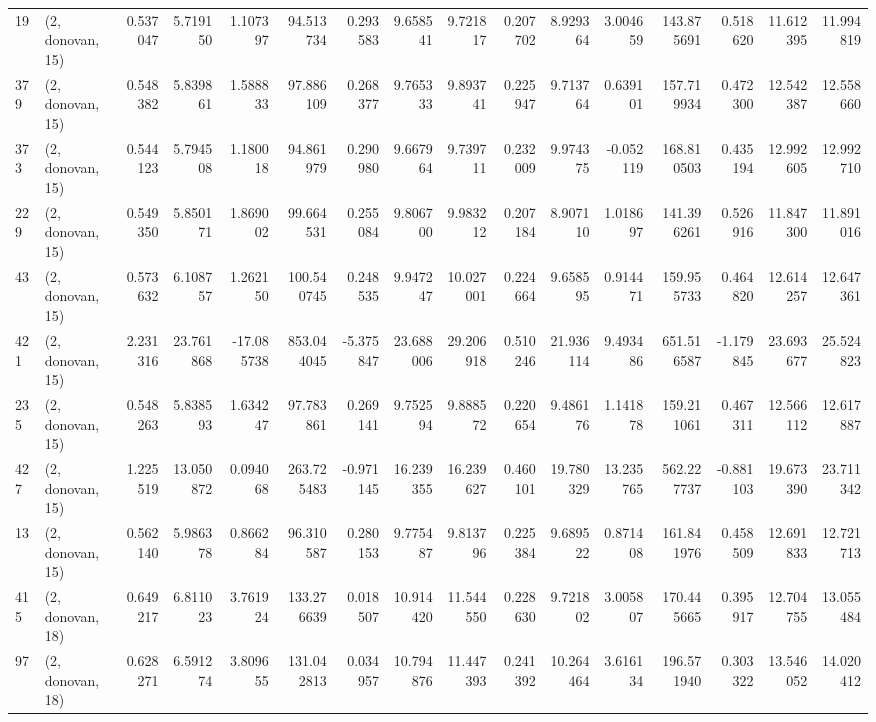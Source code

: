\begin{tabular}{llrrrrrrrrrrrrrr}
19  &  (2, donovan, 15) &   0.537047 &   5.719150 &   1.107397 &    94.513734 &   0.293583 &   9.658541 &   9.721817 &  0.207702 &   8.929364 &   3.004659 &   143.875691 &  0.518620 &  11.612395 &  11.994819 \\
379 &  (2, donovan, 15) &   0.548382 &   5.839861 &   1.588833 &    97.886109 &   0.268377 &   9.765333 &   9.893741 &  0.225947 &   9.713764 &   0.639101 &   157.719934 &  0.472300 &  12.542387 &  12.558660 \\
373 &  (2, donovan, 15) &   0.544123 &   5.794508 &   1.180018 &    94.861979 &   0.290980 &   9.667964 &   9.739711 &  0.232009 &   9.974375 &  -0.052119 &   168.810503 &  0.435194 &  12.992605 &  12.992710 \\
229 &  (2, donovan, 15) &   0.549350 &   5.850171 &   1.869002 &    99.664531 &   0.255084 &   9.806700 &   9.983212 &  0.207184 &   8.907110 &   1.018697 &   141.396261 &  0.526916 &  11.847300 &  11.891016 \\
43  &  (2, donovan, 15) &   0.573632 &   6.108757 &   1.262150 &   100.540745 &   0.248535 &   9.947247 &  10.027001 &  0.224664 &   9.658595 &   0.914471 &   159.955733 &  0.464820 &  12.614257 &  12.647361 \\
421 &  (2, donovan, 15) &   2.231316 &  23.761868 & -17.085738 &   853.044045 &  -5.375847 &  23.688006 &  29.206918 &  0.510246 &  21.936114 &   9.493486 &   651.516587 & -1.179845 &  23.693677 &  25.524823 \\
235 &  (2, donovan, 15) &   0.548263 &   5.838593 &   1.634247 &    97.783861 &   0.269141 &   9.752594 &   9.888572 &  0.220654 &   9.486176 &   1.141878 &   159.211061 &  0.467311 &  12.566112 &  12.617887 \\
427 &  (2, donovan, 15) &   1.225519 &  13.050872 &   0.094068 &   263.725483 &  -0.971145 &  16.239355 &  16.239627 &  0.460101 &  19.780329 &  13.235765 &   562.227737 & -0.881103 &  19.673390 &  23.711342 \\
13  &  (2, donovan, 15) &   0.562140 &   5.986378 &   0.866284 &    96.310587 &   0.280153 &   9.775487 &   9.813796 &  0.225384 &   9.689522 &   0.871408 &   161.841976 &  0.458509 &  12.691833 &  12.721713 \\
415 &  (2, donovan, 18) &   0.649217 &   6.811023 &   3.761924 &   133.276639 &   0.018507 &  10.914420 &  11.544550 &  0.228630 &   9.721802 &   3.005807 &   170.445665 &  0.395917 &  12.704755 &  13.055484 \\
97  &  (2, donovan, 18) &   0.628271 &   6.591274 &   3.809655 &   131.042813 &   0.034957 &  10.794876 &  11.447393 &  0.241392 &  10.264464 &   3.616134 &   196.571940 &  0.303322 &  13.546052 &  14.020412 \\

\end{tabular}
